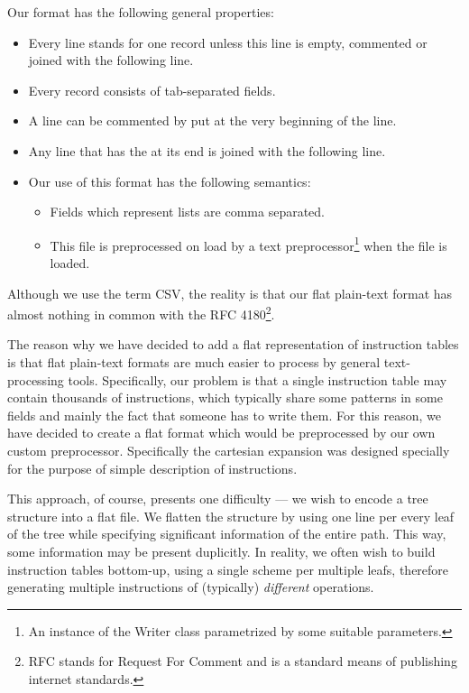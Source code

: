 Our format has the following general properties:
\begin{itemize}
  \item Every line stands for one record unless this line is empty, commented or joined with the following line.
  \item Every record consists of tab-separated fields.
  \item A line can be commented by \ttt{\#} put at the very beginning of the line.
  \item Any line that has the \ttt{\\} at its end is joined with the following line.
  \item Our use of this format has the following semantics:
  \begin{itemize}
	\item Fields which represent lists are comma separated.
	\item This file is preprocessed on load by a text preprocessor\footnote{An instance of the Writer class parametrized by some suitable parameters.} when the file is loaded.
  \end{itemize}
\end{itemize}

Although we use the term CSV, the reality is that our flat plain-text format has almost nothing in common with the RFC 4180\footnote{RFC stands for Request For Comment and is a standard means of publishing internet standards.}.

The reason why we have decided to add a flat representation of instruction tables is that flat plain-text formats are much easier to process by general text-processing tools. Specifically, our problem is that a single instruction table may contain thousands of instructions, which typically share some patterns in some fields and mainly the fact that someone has to write them. For this reason, we have decided to create a flat format which would be preprocessed by our own custom preprocessor. Specifically the cartesian expansion was designed specially for the purpose of simple description of instructions.

This approach, of course, presents one difficulty --- we wish to encode a tree structure into a flat file. We flatten the structure by using one line per every leaf of the tree while specifying significant information of the entire path. This way, some information may be present duplicitly. In reality, we often wish to build instruction tables bottom-up, using a single scheme per multiple leafs, therefore generating multiple instructions of (typically) \emph{different} operations. 

